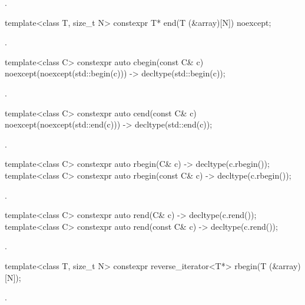 \begin{itemdescr}
\pnum
\returns {}.
\end{itemdescr}

%
\begin{itemdecl}
template<class T, size_t N> constexpr T* end(T (&array)[N]) noexcept;
\end{itemdecl}

\begin{itemdescr}
\pnum
\returns {}.
\end{itemdescr}

%
\begin{itemdecl}
template<class C> constexpr auto cbegin(const C& c) noexcept(noexcept(std::begin(c)))
  -> decltype(std::begin(c));
\end{itemdecl}
\begin{itemdescr}
\pnum \returns {}.
\end{itemdescr}

%
\begin{itemdecl}
template<class C> constexpr auto cend(const C& c) noexcept(noexcept(std::end(c)))
  -> decltype(std::end(c));
\end{itemdecl}
\begin{itemdescr}
\pnum \returns {}.
\end{itemdescr}

%
\begin{itemdecl}
template<class C> constexpr auto rbegin(C& c) -> decltype(c.rbegin());
template<class C> constexpr auto rbegin(const C& c) -> decltype(c.rbegin());
\end{itemdecl}
\begin{itemdescr}
\pnum \returns {}.
\end{itemdescr}

%
\begin{itemdecl}
template<class C> constexpr auto rend(C& c) -> decltype(c.rend());
template<class C> constexpr auto rend(const C& c) -> decltype(c.rend());
\end{itemdecl}
\begin{itemdescr}
\pnum \returns {}.
\end{itemdescr}

%
\begin{itemdecl}
template<class T, size_t N> constexpr reverse_iterator<T*> rbegin(T (&array)[N]);
\end{itemdecl}
\begin{itemdescr}
\pnum \returns {}.
\end{itemdescr}


